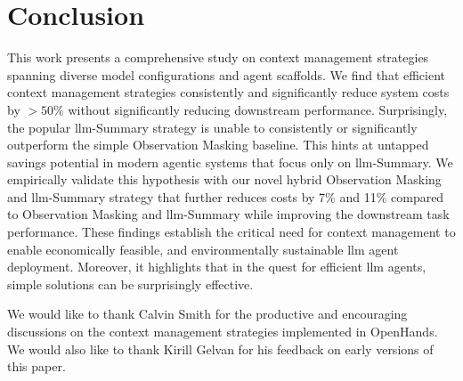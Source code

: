 \documentclass{article}
\begin{document}
\section{Conclusion}
\label{sec:conclusion}
This work presents a comprehensive study on context management strategies spanning diverse model configurations and agent scaffolds. We find that efficient context management strategies consistently and significantly reduce system costs by $>50\%$ without significantly reducing downstream performance. Surprisingly, the popular \ac{llm}-Summary strategy is unable to consistently or significantly outperform the simple Observation Masking baseline. This hints at untapped savings potential in modern agentic systems that focus only on \ac{llm}-Summary. We empirically validate this hypothesis with our novel hybrid Observation Masking and \ac{llm}-Summary strategy that further reduces costs by 7\% and 11\% compared to Observation Masking and \ac{llm}-Summary while improving the downstream task performance. These findings establish the critical need for context management to enable economically feasible, and environmentally sustainable \ac{llm} agent deployment. Moreover, it highlights that in the quest for efficient \ac{llm} agents, simple solutions can be surprisingly effective.

\begin{ack}
We would like to thank Calvin Smith for the productive and encouraging discussions on the context management strategies implemented in OpenHands. We would also like to thank Kirill Gelvan for his feedback on early versions of this paper.
\end{ack}
\end{document}
